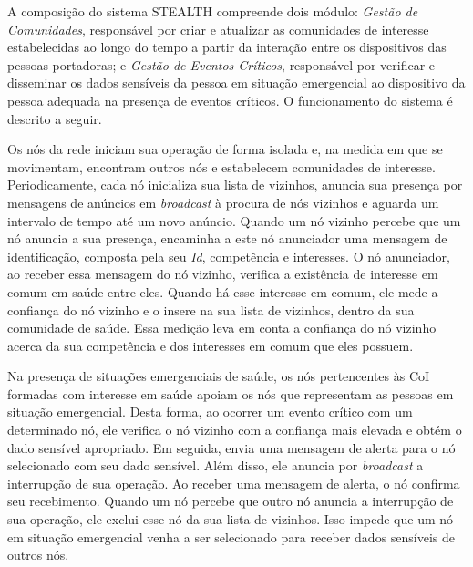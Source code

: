 \documentclass[12pt]{article}
\begin{document}
A composição do sistema \mbox{STEALTH}
compreende dois
módulo: {\it Gestão de Comunidades}, responsável por criar e atualizar as comunidades de interesse estabelecidas ao longo do tempo a partir da interação entre os dispositivos das pessoas portadoras; e
{\it Gestão de Eventos Críticos}, responsável por verificar e disseminar os dados sensíveis da pessoa em situação emergencial ao dispositivo da pessoa adequada na presença de eventos críticos. O funcionamento do sistema é descrito a seguir.

Os nós da rede iniciam sua operação de forma isolada e, na medida em que se movimentam, encontram outros nós e estabelecem comunidades de interesse. Periodicamente, cada nó inicializa sua lista de vizinhos, anuncia sua presença por mensagens de anúncios em \textit{broadcast} à procura de nós vizinhos e aguarda um intervalo de tempo até um novo anúncio.  Quando um nó vizinho percebe que um nó anuncia a sua presença, encaminha a este nó anunciador uma mensagem de identificação, composta pela seu \textit{Id}, competência e interesses. O nó anunciador, ao receber essa mensagem do nó vizinho, verifica a existência de interesse em comum em saúde entre eles. Quando há esse interesse em comum, ele mede a confiança do nó vizinho e o insere na sua lista de vizinhos, dentro da sua comunidade de saúde. Essa medição leva em conta a confiança do nó vizinho acerca da sua competência e dos interesses em comum que eles possuem.

Na presença de situações emergenciais de saúde, os nós pertencentes às CoI formadas com interesse em saúde apoiam os nós que representam as pessoas em situação emergencial. Desta forma, ao ocorrer um evento crítico com um determinado nó, ele verifica o nó vizinho com a confiança mais elevada e obtém o dado sensível apropriado. Em seguida, envia uma mensagem de alerta para o nó selecionado com seu dado sensível. Além disso, ele anuncia por \textit{broadcast} a interrupção de sua operação. Ao receber uma mensagem de alerta, o nó confirma seu recebimento. Quando um nó percebe que outro nó anuncia a interrupção de sua operação, ele exclui esse nó da sua lista de vizinhos. Isso impede que um nó em situação emergencial venha a ser selecionado para receber dados sensíveis de outros nós.
\end{document}
